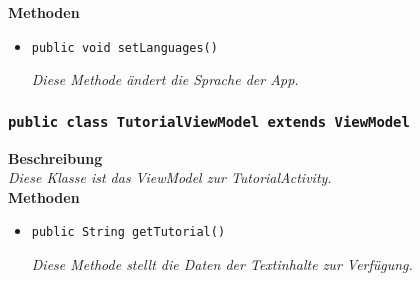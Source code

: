 		\textbf{Methoden}
 			\begin{itemize}
        		\item\texttt{{public void setLanguages()}}
        	
        		\textit{Diese Methode ändert die Sprache der App.}
        	
       		 \end{itemize}
       		 
        \subsubsection{\texttt{public class TutorialViewModel extends ViewModel}}
        \textbf{Beschreibung} \\
        \textit{Diese Klasse ist das ViewModel zur TutorialActivity.}\\
        
		\textbf{Methoden}
 			\begin{itemize}
        		\item\texttt{{public String getTutorial()}}
        		
        		\textit{Diese Methode stellt die Daten der Textinhalte zur Verfügung.}
        	
       		 \end{itemize}